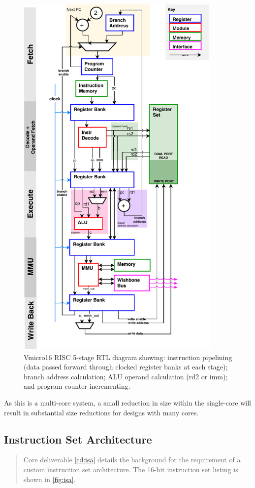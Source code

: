 \begin{figure}[H]
\centering 
\includegraphics[width=10cm]{../img/risc}
\caption{Vmicro16 RISC 5-stage RTL diagram showing: instruction pipelining (data passed forward through clocked register banks at each stage); branch address calculation; ALU operand calculation (rd2 or imm); and program counter incrementing.}
\label{fig:risc}
\end{figure}

As this is a multi-core system, a small reduction in size within the single-core will result in substantial size reductions for designs with many cores.

\subsection{Instruction Set Architecture}
\begin{quotation}
\noindent Core deliverable \ref{cd:isa} details the background for the requirement of a custom instruction set architecture. 
The 16-bit instruction set listing is shown in \cref{fig:isa}.
\end{quotation}

